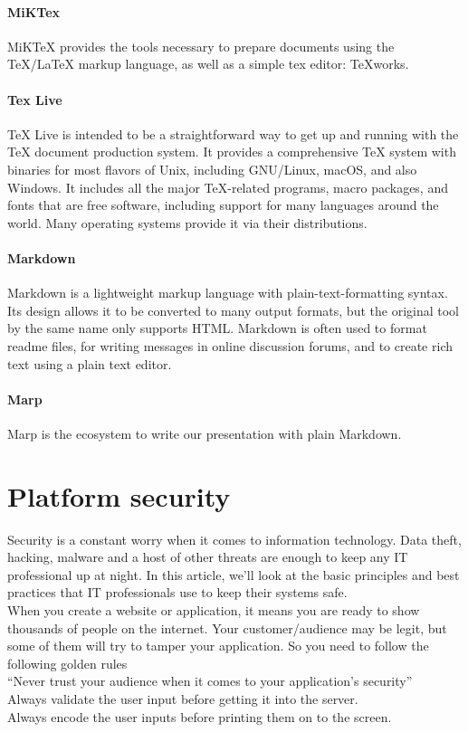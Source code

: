 \paragraph*{MiKTex}
MiKTeX provides the tools necessary to prepare documents using the TeX/LaTeX markup language, as well as a simple tex editor: TeXworks.

\paragraph*{Tex Live}
TeX Live is intended to be a straightforward way to get up and running with the TeX document production system. It provides a comprehensive TeX system with binaries for most flavors of Unix, including GNU/Linux, macOS, and also Windows. It includes all the major TeX-related programs, macro packages, and fonts that are free software, including support for many languages around the world. Many operating systems provide it via their distributions.



\paragraph*{Markdown}
Markdown is a lightweight markup language with plain-text-formatting syntax. Its design allows it to be converted to many output formats, but the original tool by the same name only supports HTML. Markdown is often used to format readme files, for writing messages in online discussion forums, and to create rich text using a plain text editor.
\paragraph*{Marp}
Marp is the ecosystem to write our presentation with plain Markdown.


\section{Platform security}
Security is a constant worry when it comes to information technology. Data theft, hacking, malware and a host of other threats are enough to keep any IT professional up at night. In this article, we’ll look at the basic principles and best practices that IT professionals use to keep their systems safe.
\\
When you create a website or application, it means you are ready to show thousands of people on the internet. Your customer/audience may be legit, but some of them will try to tamper your application. So you need to follow the following golden rules
\\
“Never trust your audience when it comes to your application’s security”\\
Always validate the user input before getting it into the server.\\
Always encode the user inputs before printing them on to the screen.\\

